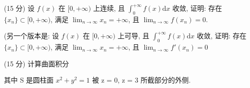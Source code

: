 (15 分) 设 $f(x)$ 在 $[0, +\infty)$ 上连续, 且 $\int_{0}^{+\infty} f(x) \mathrm{d}x$ 收敛, 证明: 存在 $\{x_{n}\} \subset [0, +\infty)$, 满足 $\lim_{n \to \infty} x_{n} = +\infty$, 且 $\lim_{n \to \infty} f(x_{n}) = 0$.\par
(另一个版本是: 设 $f(x)$ 在 $[0, +\infty)$ 上可导, 且 $\int_{0}^{+\infty} f(x) \mathrm{d}x$ 收敛, 证明: 存在 $\{x_n\} \subset [0, +\infty)$, 满足 $\lim_{n \to \infty} x_n = +\infty$, 且 $\lim_{n \to \infty} f'(x_n) = 0$\par
\par{}
(15 分) 计算曲面积分\par
\nopagebreak[4]
其中 S 是圆柱面  $x^{2} + y^{2} = 1$  被 z = 0, z = 3 所截部分的外侧.\par
